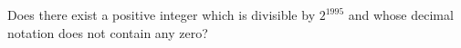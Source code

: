 Does there exist a positive integer which is divisible by $2^{1995}$ and whose decimal notation does not contain any zero?
